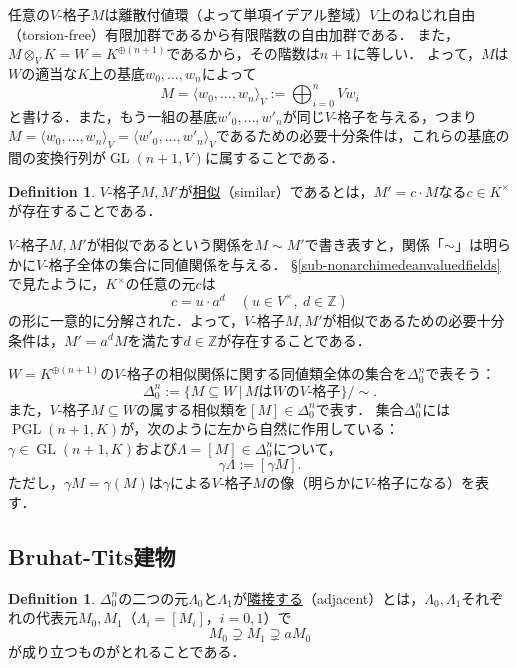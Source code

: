 \documentclass[a4paper,12pt, dvipdfmx]{jsbook}
\def\Z{\mathbb{Z}}
\def\GL{\mathop{\mathrm{GL}}\nolimits}
\def\PGL{\mathop{\mathrm{PGL}}\nolimits}
\theoremstyle{plain}
\theoremstyle{definition}
\newtheorem{dfn}[thm]{\bfseries Definition}
\begin{document}
任意の$V$-格子$M$は離散付値環（よって単項イデアル整域）$V$上のねじれ自由（torsion-free）有限加群であるから有限階数の自由加群である．
また，$M\otimes_VK=W=K^{\oplus (n+1)}$であるから，その階数は$n+1$に等しい．
よって，$M$は$W$の適当な$K$上の基底$w_0,\ldots,w_n$によって
$$
M=\langle w_0,\ldots,w_n\rangle_V:=\bigoplus^n_{i=0}Vw_i
$$
と書ける．また，もう一組の基底$w'_0,\ldots,w'_n$が同じ$V$-格子を与える，つまり$M=\langle w_0,\ldots,w_n\rangle_V=\langle w'_0,\ldots,w'_n\rangle_V$であるための必要十分条件は，これらの基底の間の変換行列が$\GL(n+1,V)$に属することである．
\begin{dfn}\label{dfn-similarity}{\rm 
$V$-格子$M,M'$が\underline{相似}（similar）であるとは，$M'=c\cdot M$なる$c\in K^{\times}$が存在することである．}
\end{dfn}

$V$-格子$M,M'$が相似であるという関係を$M\sim M'$で書き表すと，関係「$\sim$」は明らかに$V$-格子全体の集合に同値関係を与える．
\S\ref{sub-nonarchimedeanvaluedfields}で見たように，$K^{\times}$の任意の元$c$は
$$
c=u\cdot a^d\quad(u\in V^{\times},\ d\in\Z)
$$
の形に一意的に分解された．よって，$V$-格子$M,M'$が相似であるための必要十分条件は，$M'=a^dM$を満たす$d\in\Z$が存在することである．

$W=K^{\oplus (n+1)}$の$V$-格子の相似関係に関する同値類全体の集合を$\Delta^n_0$で表そう：
$$
{\textstyle \Delta^n_0:=\big\{M\subseteq W\,|\,\textrm{$M$は$W$の$V$-格子}\big\}/\sim.}
$$
また，$V$-格子$M\subseteq W$の属する相似類を$[M]\in\Delta^n_0$で表す．
集合$\Delta^n_0$には$\PGL(n+1,K)$が，次のように左から自然に作用している：$\gamma\in\GL(n+1,K)$および$\Lambda=[M]\in\Delta^n_0$について，
$$
\gamma\Lambda:=[\gamma M].
$$
ただし，$\gamma M=\gamma(M)$は$\gamma$による$V$-格子$M$の像（明らかに$V$-格子になる）を表す．

\subsection{Bruhat-Tits建物}\label{sub-building}
\begin{dfn}\label{dfn-adjacent}{\rm 
$\Delta^n_0$の二つの元$\Lambda_0$と$\Lambda_1$が\underline{隣接する}（adjacent）とは，$\Lambda_0,\Lambda_1$それぞれの代表元$M_0,M_1$（$\Lambda_i=[M_i]$，$i=0,1$）で
$$
M_0\supsetneq M_1\supsetneq aM_0
$$
が成り立つものがとれることである．}
\end{dfn}
\end{document}
